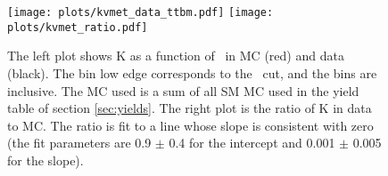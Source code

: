 






\begin{figure}[hbt]
  \begin{center}
	\texttt{[image: plots/kvmet\_data\_ttbm.pdf]}
	\texttt{[image: plots/kvmet\_ratio.pdf]}
	\caption{
	  \label{fig:kvmet}\protect 
	  The left plot shows
	  K as a function of \MET\ in MC (red) and data (black). 
	  The bin low edge corresponds to the \MET\ cut, and the 
	  bins are inclusive.
	  The MC used is a sum of all SM MC used in the yield table of
	  section \ref{sec:yields}.
	  The right plot is the ratio of K in data to MC.
	  The ratio is fit to a line whose slope is consistent with zero
	  (the fit parameters are 
	  0.9 $\pm$  0.4 for the intercept and
      0.001 $\pm$ 0.005 for the slope).
	}
  \end{center}
\end{figure}



